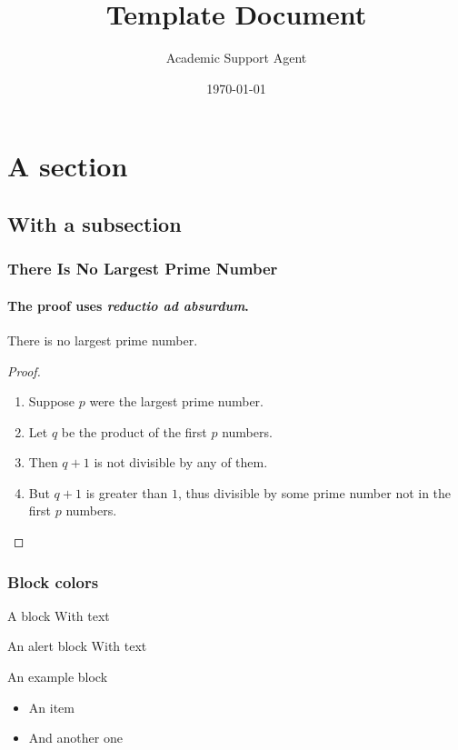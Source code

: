 \documentclass{article}
\title{Template Document}
\author{Academic Support Agent}
\date{\today}
\begin{document}
\maketitle

\begin{frame}
	\titlepage
\end{frame}

\begin{frame}
	
\end{frame}

\section{A section}
\subsection{With a subsection}

\begin{frame}
	\frametitle{There Is No Largest Prime Number}
	\framesubtitle{The proof uses \textit{reductio ad absurdum}.}
	\begin{theorem}
		There is no largest prime number.
	\end{theorem}
	\begin{proof}
		\begin{enumerate}
			\item<1-| alert@1> Suppose $p$ were the largest prime number.
			\item<2-> Let $q$ be the product of the first $p$ numbers.
			\item<3-> Then $q+1$ is not divisible by any of them.
			\item<1-> But $q + 1$ is greater than $1$, thus divisible by some prime
				number not in the first $p$ numbers.\qedhere
		\end{enumerate}
	\end{proof}
\end{frame}

\begin{frame}
	\frametitle{Block colors}
	\begin{block}{A block}
		With text
	\end{block}
	\begin{alertblock}{An alert block}
		With text
	\end{alertblock}
	\begin{exampleblock}{An example block}
		\begin{itemize}
			\item An item
			\item And another one
		\end{itemize}
	\end{exampleblock}
\end{frame}
\end{document}
